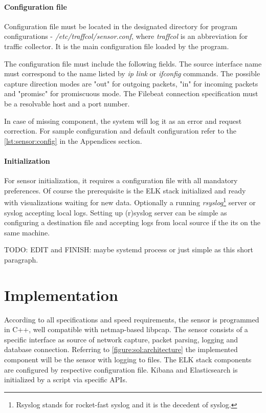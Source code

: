 \documentclass[12pt,a4paper,twoside]{report}
\begin{document}
			\subsubsection*{Configuration file} \label{implementation:sensor:config}
				Configuration file must be located in the designated directory for program configurations - \emph{/etc/traffcol/sensor.conf}, where \emph{traffcol} is an abbreviation for traffic collector. It is the main configuration file loaded by the program.\par
				The configuration file must include the following fields. The source interface name must correspond to the name listed by \emph{ip link} or \emph{ifconfig} commands. The possible capture direction modes are "out" for outgoing packets, "in" for incoming packets and "promisc" for promiscuous mode. The Filebeat connection specification must be a resolvable host and a port number.\par
				In case of missing component, the system will log it as an error and request correction. For sample configuration and default configuration refer to the \autoref{lst:sensor:config} in the Appendices section.
			\subsubsection*{Initialization}
			For sensor initialization, it requires a configuration file with all mandatory preferences. Of course the prerequisite is the ELK stack initialized and ready with visualizations waiting for new data. Optionally a running \emph{rsyslog}\footnote{Rsyslog stands for rocket-fast syslog and it is the decedent of syslog.} server or syslog accepting local logs. Setting up (r)syslog server can be simple as configuring a destination file and accepting logs from local source if the its on the same machine.\par
			TODO: EDIT and FINISH: maybe systemd process or just simple as this short paragraph.
			
\chapter{Implementation} \label{solution:implementation}
	According to all specifications and speed requirements, the sensor is programmed in C++, well compatible with netmap-based libpcap. The sensor consists of a specific interface as source of network capture, packet parsing, logging and database connection. Referring to \autoref{figure:sol:architecture} the implemented component will be the sensor with logging to files. The ELK stack components are configured by respective configuration file. Kibana and Elasticsearch is initialized by a script via specific APIs.
\end{document}
